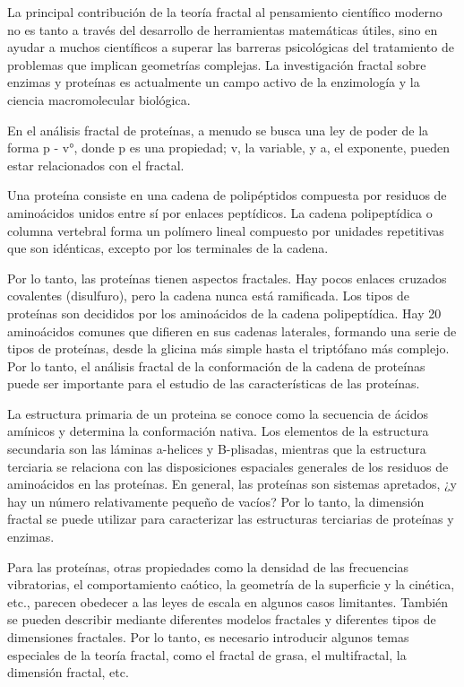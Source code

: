 \documentclass[11pt]{article}
\begin{document}
La principal contribución de la teoría fractal al pensamiento científico moderno no es tanto a través del desarrollo de herramientas matemáticas útiles, sino en ayudar a muchos científicos a superar las barreras psicológicas del tratamiento de problemas que implican geometrías complejas. La investigación fractal sobre enzimas y proteínas es actualmente un campo activo de la enzimología y la ciencia macromolecular biológica.

En el análisis fractal de proteínas, a menudo se busca una ley de poder de la forma p - v°, donde p es una propiedad; v, la variable, y a, el exponente, pueden estar relacionados con el fractal.



Una proteína consiste en una cadena de polipéptidos compuesta por residuos de aminoácidos unidos entre sí por enlaces peptídicos. La cadena polipeptídica o columna vertebral forma un polímero lineal compuesto por unidades repetitivas que son idénticas, excepto por los terminales de la cadena.

Por lo tanto, las proteínas tienen aspectos fractales. Hay pocos enlaces cruzados covalentes (disulfuro), pero la cadena nunca está ramificada. Los tipos de proteínas son decididos por los aminoácidos de la cadena polipeptídica. Hay 20 aminoácidos comunes que difieren en sus cadenas laterales, formando una serie de tipos de proteínas, desde la glicina más simple hasta el triptófano más complejo. Por lo tanto, el análisis fractal de la conformación de la cadena de proteínas puede ser importante para el estudio de las características de las proteínas.

La estructura primaria de un proteina se conoce como la secuencia de ácidos amínicos y determina la conformación nativa. Los elementos de la estructura secundaria son las láminas a-helices y B-plisadas, mientras que la estructura terciaria se relaciona con las disposiciones espaciales generales de los residuos de aminoácidos en las proteínas. En general, las proteínas son sistemas apretados, ¿y hay un número relativamente pequeño de vacíos? Por lo tanto, la dimensión fractal se puede utilizar para caracterizar las estructuras terciarias de proteínas y enzimas.

Para las proteínas, otras propiedades como la densidad de las frecuencias vibratorias, el comportamiento caótico, la geometría de la superficie y la cinética, etc., parecen obedecer a las leyes de escala en algunos casos limitantes. También se pueden describir mediante diferentes modelos fractales y diferentes tipos de dimensiones fractales. Por lo tanto, es necesario introducir algunos temas especiales de la teoría fractal, como el fractal de grasa, el multifractal, la dimensión fractal, etc.
\end{document}

